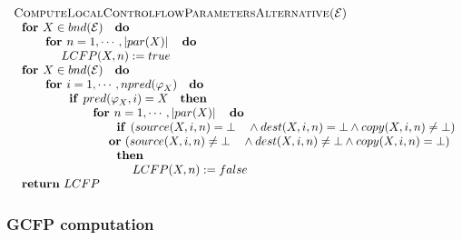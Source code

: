 \begin{equation*}
\begin{tabular}{l}
\textsc{ComputeLocalControlflowParametersAlternative(}$\mathcal{E}$\textsc{)}
\\ 
$\text{\textbf{for }}X\in bnd(\mathcal{E})\text{ \textbf{do}}$ \\ 
$\qquad \text{\textbf{for }}n=1,\cdots ,\left\vert par(X)\right\vert \text{ 
\textbf{do}}$ \\ 
$\qquad \qquad LCFP(X,n):=true$ \\ 
$\text{\textbf{for }}X\in bnd(\mathcal{E})\text{ \textbf{do}}$ \\ 
$\qquad \text{\textbf{for }}i=1,\cdots ,npred(\varphi _{X})\text{ \textbf{do}%
}$ \\ 
$\qquad \qquad \text{\textbf{if }}pred(\varphi _{X},i)=X\text{ \textbf{then}}
$ \\ 
$\qquad \qquad \qquad \text{\textbf{for }}n=1,\cdots ,\left\vert
par(X)\right\vert \text{ \textbf{do}}$ \\ 
$\qquad \qquad \qquad \qquad \text{\textbf{if }}(source(X,i,n)=\bot \text{ }%
\wedge dest(X,i,n)=\bot \wedge copy(X,i,n)\neq \bot )$ \\ 
$\qquad \qquad \qquad \qquad $\textbf{or} $(source(X,i,n)\neq \bot \text{ }%
\wedge dest(X,i,n)\neq \bot \wedge copy(X,i,n)=\bot )$ \\ 
$\qquad \qquad \qquad \qquad \text{\textbf{then}}$ \\ 
$\qquad \qquad \qquad \qquad \qquad LCFP(X,n):=false$ \\ 
$\text{\textbf{return} }LCFP$%
\end{tabular}%
\end{equation*}

\subsubsection{GCFP computation}

